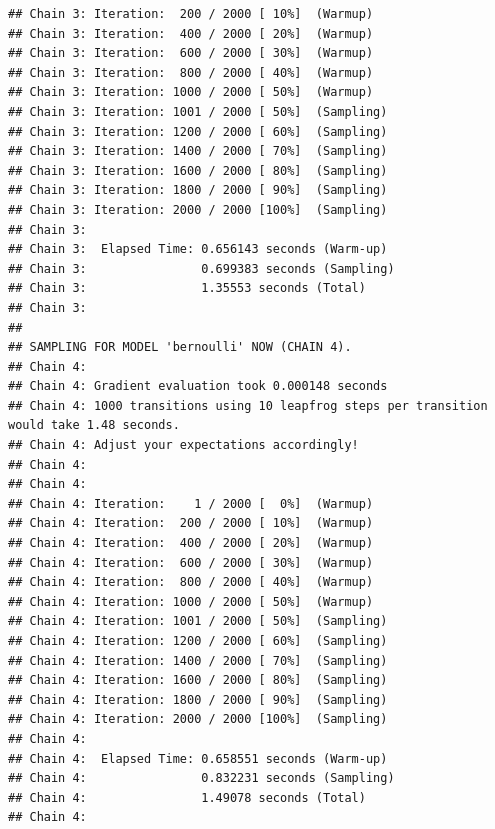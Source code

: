 \documentclass[
]{article}
\begin{document}
\begin{verbatim}
## Chain 3: Iteration:  200 / 2000 [ 10%]  (Warmup)
## Chain 3: Iteration:  400 / 2000 [ 20%]  (Warmup)
## Chain 3: Iteration:  600 / 2000 [ 30%]  (Warmup)
## Chain 3: Iteration:  800 / 2000 [ 40%]  (Warmup)
## Chain 3: Iteration: 1000 / 2000 [ 50%]  (Warmup)
## Chain 3: Iteration: 1001 / 2000 [ 50%]  (Sampling)
## Chain 3: Iteration: 1200 / 2000 [ 60%]  (Sampling)
## Chain 3: Iteration: 1400 / 2000 [ 70%]  (Sampling)
## Chain 3: Iteration: 1600 / 2000 [ 80%]  (Sampling)
## Chain 3: Iteration: 1800 / 2000 [ 90%]  (Sampling)
## Chain 3: Iteration: 2000 / 2000 [100%]  (Sampling)
## Chain 3: 
## Chain 3:  Elapsed Time: 0.656143 seconds (Warm-up)
## Chain 3:                0.699383 seconds (Sampling)
## Chain 3:                1.35553 seconds (Total)
## Chain 3: 
## 
## SAMPLING FOR MODEL 'bernoulli' NOW (CHAIN 4).
## Chain 4: 
## Chain 4: Gradient evaluation took 0.000148 seconds
## Chain 4: 1000 transitions using 10 leapfrog steps per transition would take 1.48 seconds.
## Chain 4: Adjust your expectations accordingly!
## Chain 4: 
## Chain 4: 
## Chain 4: Iteration:    1 / 2000 [  0%]  (Warmup)
## Chain 4: Iteration:  200 / 2000 [ 10%]  (Warmup)
## Chain 4: Iteration:  400 / 2000 [ 20%]  (Warmup)
## Chain 4: Iteration:  600 / 2000 [ 30%]  (Warmup)
## Chain 4: Iteration:  800 / 2000 [ 40%]  (Warmup)
## Chain 4: Iteration: 1000 / 2000 [ 50%]  (Warmup)
## Chain 4: Iteration: 1001 / 2000 [ 50%]  (Sampling)
## Chain 4: Iteration: 1200 / 2000 [ 60%]  (Sampling)
## Chain 4: Iteration: 1400 / 2000 [ 70%]  (Sampling)
## Chain 4: Iteration: 1600 / 2000 [ 80%]  (Sampling)
## Chain 4: Iteration: 1800 / 2000 [ 90%]  (Sampling)
## Chain 4: Iteration: 2000 / 2000 [100%]  (Sampling)
## Chain 4: 
## Chain 4:  Elapsed Time: 0.658551 seconds (Warm-up)
## Chain 4:                0.832231 seconds (Sampling)
## Chain 4:                1.49078 seconds (Total)
## Chain 4:
\end{verbatim}
\end{document}
